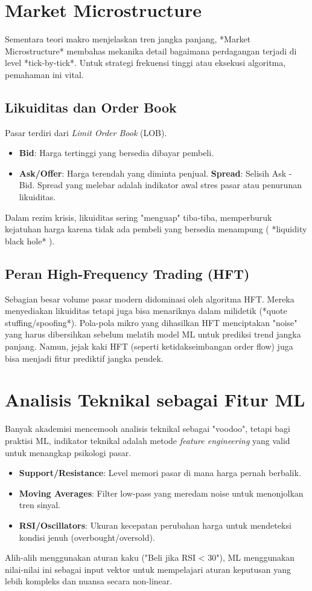 \documentclass[12pt,a4paper]{book}
\begin{document}
\section{Market Microstructure}
Sementara teori makro menjelaskan tren jangka panjang, *Market Microstructure* membahas mekanika detail bagaimana perdagangan terjadi di level *tick-by-tick*. Untuk strategi frekuensi tinggi atau eksekusi algoritma, pemahaman ini vital.

\subsection{Likuiditas dan Order Book}
Pasar terdiri dari \textit{Limit Order Book} (LOB).
\begin{itemize}
    \item \textbf{Bid}: Harga tertinggi yang bersedia dibayar pembeli.
    \item \textbf{Ask/Offer}: Harga terendah yang diminta penjual.
    \textbf{Spread}: Selisih Ask - Bid. Spread yang melebar adalah indikator awal stres pasar atau penurunan likuiditas.
\end{itemize}
Dalam rezim krisis, likuiditas sering "menguap" tiba-tiba, memperburuk kejatuhan harga karena tidak ada pembeli yang bersedia menampung ( *liquidity black hole* ).

\subsection{Peran High-Frequency Trading (HFT)}
Sebagian besar volume pasar modern didominasi oleh algoritma HFT. Mereka menyediakan likuiditas tetapi juga bisa menariknya dalam milidetik (*quote stuffing/spoofing*). Pola-pola mikro yang dihasilkan HFT menciptakan "noise" yang harus dibersihkan sebelum melatih model ML untuk prediksi trend jangka panjang. Namun, jejak kaki HFT (seperti ketidakseimbangan order flow) juga bisa menjadi fitur prediktif jangka pendek.

\section{Analisis Teknikal sebagai Fitur ML}
Banyak akademisi mencemooh analisis teknikal sebagai "voodoo", tetapi bagi praktisi ML, indikator teknikal adalah metode \textit{feature engineering} yang valid untuk menangkap psikologi pasar.
\begin{itemize}
    \item \textbf{Support/Resistance}: Level memori pasar di mana harga pernah berbalik.
    \item \textbf{Moving Averages}: Filter low-pass yang meredam noise untuk menonjolkan tren sinyal.
    \item \textbf{RSI/Oscillators}: Ukuran kecepatan perubahan harga untuk mendeteksi kondisi jenuh (overbought/oversold).
\end{itemize}
Alih-alih menggunakan aturan kaku ("Beli jika RSI < 30"), ML menggunakan nilai-nilai ini sebagai input vektor untuk mempelajari aturan keputusan yang lebih kompleks dan nuansa secara non-linear.
\end{document}
